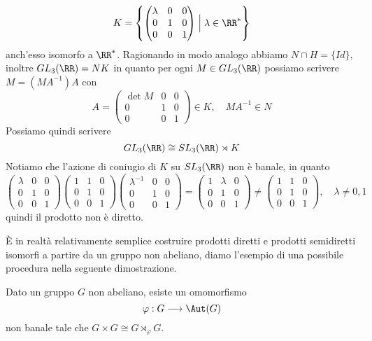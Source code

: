 \documentclass[11pt]{scrartcl}
\begin{document}
	\[
	K = \left\{\begin{pmatrix}
		\lambda & 0 & 0\\
		0 & 1 & 0\\
		0 & 0 & 1
	\end{pmatrix}\Bigm| \lambda \in \RR^* \right\}
	\]
	anch'esso isomorfo a $\RR^*$. Ragionando in modo analogo abbiamo $N \cap H = \{Id\}$, 
	inoltre $GL_3(\RR) = NK$ in quanto per ogni $M \in GL_3(\RR)$ possiamo scrivere
	$M = (MA^{-1})A$ con 
	\[
	A = \begin{pmatrix}
		\det M & 0 & 0\\
		0 & 1 & 0\\
		0 & 0 & 1
	\end{pmatrix} \in K, \quad MA^{-1} \in N
	\]
	Possiamo quindi scrivere 
	\[
	GL_3(\RR) \cong SL_3(\RR)\rtimes K
	\]
	Notiamo che l'azione di coniugio di $K$ su $SL_3(\RR)$ non è banale, in 
	quanto
	\[
	\begin{pmatrix}
		\lambda & 0 & 0\\
		0 & 1 & 0\\
		0 & 0 & 1
	\end{pmatrix}
	\begin{pmatrix}
		1 & 1 & 0\\
		0 & 1 & 0\\
		0 & 0 & 1
	\end{pmatrix}
	\begin{pmatrix}
		\lambda^{-1}& 0 & 0\\
		0 & 1 & 0\\
		0 & 0 & 1
	\end{pmatrix} = 
	\begin{pmatrix}
		1 & \lambda & 0\\
		0 & 1 & 0\\
		0 & 0 & 1
	\end{pmatrix} \neq \begin{pmatrix}
		1 & 1 & 0\\
		0 & 1 & 0\\
		0 & 0 & 1
	\end{pmatrix},\quad \lambda \neq 0, 1
	\]
	quindi il prodotto non è diretto.\newline
	
	
	È in realtà relativamente semplice costruire prodotti diretti e prodotti semidiretti
	isomorfi a partire da un gruppo non abeliano, diamo l'esempio di una possibile
	procedura nella seguente dimostrazione.
	
	\begin{proposition}
		Dato un gruppo $G$ non abeliano, esiste un omomorfismo
		\[
		\varphi: G\longrightarrow \Aut(G)
		\]
		non banale tale che $G\times G \cong G\rtimes_{\varphi} G$.
	\end{proposition}
	
\end{document}
